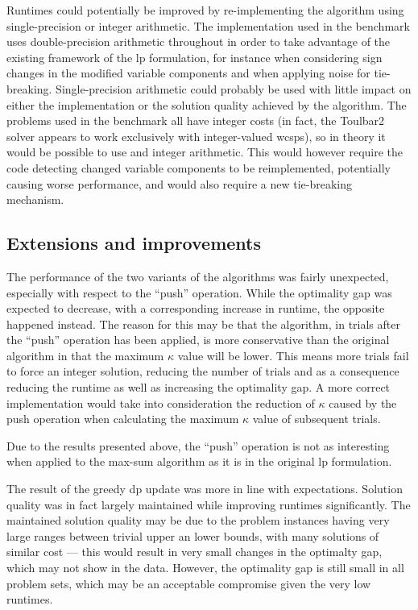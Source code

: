 Runtimes could potentially be improved by re-implementing the algorithm using single-precision or integer arithmetic.
The implementation used in the benchmark uses double-precision arithmetic throughout in order to take advantage of the existing framework of the \gls{lp} formulation, for instance when considering sign changes in the modified variable components and when applying noise for tie-breaking.
Single-precision arithmetic could probably be used with little impact on either the implementation or the solution quality achieved by the algorithm.
The problems used in the benchmark all have integer costs (in fact, the Toulbar2 solver appears to work exclusively with integer-valued \glspl{wcsp}), so in theory it would be possible to use and integer arithmetic.
This would however require the code detecting changed variable components to be reimplemented, potentially causing worse performance, and would also require a new tie-breaking mechanism.


\subsection{Extensions and improvements}
The performance of the two variants of the algorithms was fairly unexpected, especially with respect to the \enquote{push} operation.
While the optimality gap was expected to decrease, with a corresponding increase in runtime, the opposite happened instead.
The reason for this may be that the algorithm, in trials after the \enquote{push} operation has been applied, is more conservative than the original algorithm in that the maximum \(\kappa\) value will be lower. This means more trials fail to force an integer solution, reducing the number of trials and as a consequence reducing the runtime as well as increasing the optimality gap.
A more correct implementation would take into consideration the reduction of \(\kappa\) caused by the push operation when calculating the maximum \(\kappa\) value of subsequent trials.

Due to the results presented above, the \enquote{push} operation is not as interesting when applied to the max-sum algorithm as it is in the original \gls{lp} formulation.

The result of the greedy \gls{dp} update was more in line with expectations.
Solution quality was in fact largely maintained while improving runtimes significantly.
The maintained solution quality may be due to the problem instances having very large ranges between trivial upper an lower bounds, with many solutions of similar cost --- this would result in very small changes in the optimalty gap, which may not show in the data.
However, the optimality gap is still small in all problem sets, which may be an acceptable compromise given the very low runtimes.


